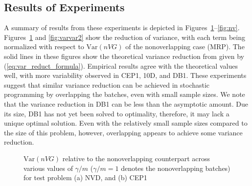 \documentclass[12pt]{article}
\newcommand{\var}[1]{\mathrm{Var} \left( #1 \right)}
\begin{document}
\subsection{Results of Experiments}
\label{ssec:results}

A summary of results from these experiments is depicted in Figures~\ref{fig:varvar1}--\ref{fig:nv}.
Figures~\ref{fig:varvar1} and \ref{fig:varvar2} show the reduction of variance, with each term being normalized with respect to $\var{nVG}$ of the nonoverlapping case (MRP). 
The solid lines in these figures show the theoretical variance reduction from \citep{Welch1987} given by (\ref{eq:var_reduct_formula}). 
Empirical results agree with the theoretical values well, with more variability observed in CEP1, 10D, and DB1. 
These experiments suggest that similar variance reduction can be achieved in stochastic programming by overlapping the batches, even with small sample sizes.
We note that the variance reduction in DB1 can be less than the asymptotic amount. %
Due its size, DB1 has not yet been solved to optimality, therefore, it may lack a unique optimal solution. 
Even with the relatively small sample sizes compared to the size of this problem, however, overlapping appears to achieve some variance reduction. 


\begin{figure}[htb!]
	\centering
	\caption{
		$\var{n VG}$ relative to the nonoverlapping counterpart across various values of $\gamma/m$ ($\gamma/m=1$ denotes the nonoverlapping batches) for test problem
		(a) NVD, and
		(b) CEP1
	}
\label{fig:varvar1}
\end{figure}
\end{document}
